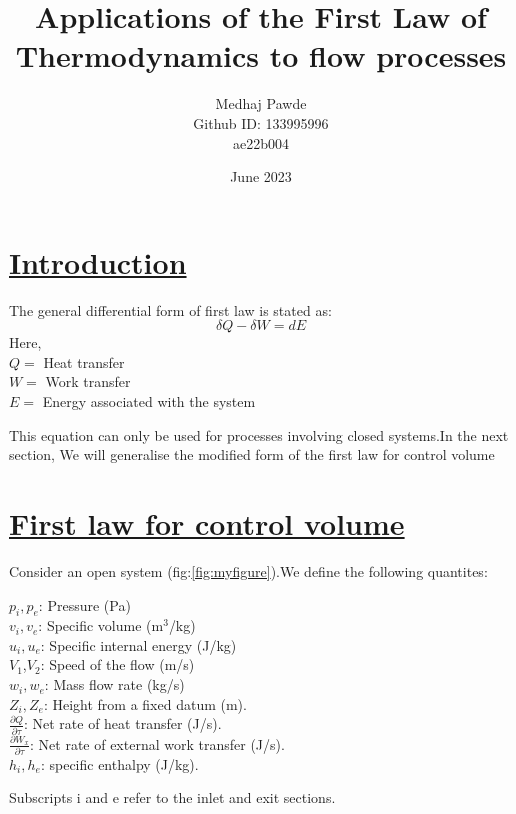 \documentclass[12pt,letterpaper]{article}
\title{Applications of the First Law of Thermodynamics to flow processes}
\author{Medhaj Pawde \\ Github ID: 133995996 \\ ae22b004}
\date{June 2023}
\begin{document}
\maketitle
\section{\underline{Introduction}}
The general differential form of first law is stated as:
\begin{equation}
    \delta Q - \delta W = dE
\end{equation}
Here, \\ \(Q =\) Heat transfer \\
\(W =\) Work transfer \\
\(E =\) Energy associated with the system


This equation can only be used for processes involving closed systems.In the next section, We will generalise the modified form of the first law for control volume\cite{nag101engineering}
\section{\underline{First law for control volume}}
Consider an open system (fig:\ref{fig:myfigure}).We define the following quantites: 

$p_i,p_e$: Pressure (Pa) \\
$v_i,v_e$: Specific volume (m$^3$/kg)\\
$u_i,u_e$: Specific internal energy (J/kg) \\
$V_1$,$V_2$: \textnormal{Speed of the flow (m/s)} \\
$w_i,w_e$: Mass flow rate  
(kg/s) \\
$Z_i,Z_e$: Height from a fixed datum (m). \\
$\frac{\partial Q}{\partial \tau}$: Net rate of heat transfer (J/s). \\
$\frac{\partial W_x}{\partial \tau}$: Net rate of external work transfer (J/s).\\
$h_i,h_e$: specific enthalpy (J/kg).



Subscripts i and e refer to the inlet and exit sections.
\end{document}
